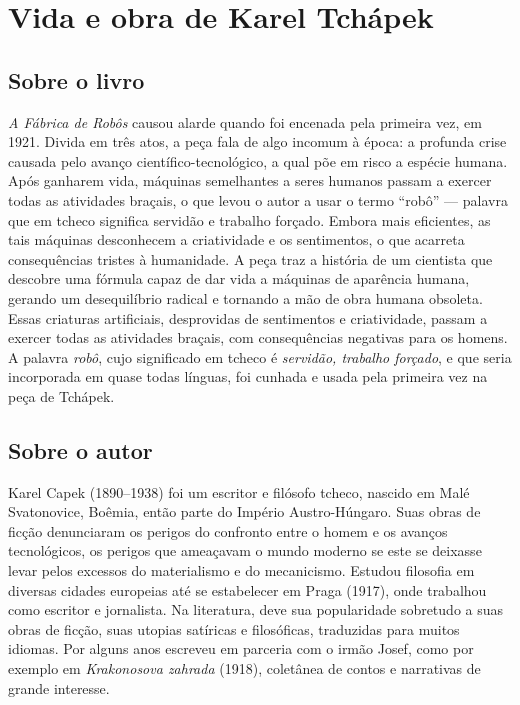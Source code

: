 \chapter{Vida e obra de Karel Tchápek}

\section{Sobre o livro}

\textit{A Fábrica de Robôs} causou alarde quando foi encenada
pela primeira vez, em 1921. Divida em três atos, a peça fala de 
algo incomum à época: a profunda crise causada pelo avanço
científico-tecnológico, a qual põe em risco a espécie humana. 
Após ganharem vida, máquinas semelhantes a seres humanos passam a exercer
todas as atividades braçais, o que levou o autor a usar o termo ``robô''
--- palavra que em tcheco significa servidão e trabalho forçado. Embora
mais eficientes, as tais máquinas
desconhecem a criatividade e os sentimentos, o que acarreta
consequências tristes à humanidade. A peça traz a história de um cientista que descobre uma
fórmula capaz de dar vida a máquinas de aparência humana, gerando um
desequilíbrio radical e tornando a mão de obra
humana obsoleta. Essas criaturas artificiais, desprovidas de sentimentos
e criatividade, passam a exercer todas as atividades braçais, com
consequências negativas para os homens. A palavra \textit{robô}, cujo
significado em tcheco é \textit{servidão, trabalho forçado}, e que seria
incorporada em quase todas línguas, foi cunhada e usada pela primeira
vez na peça de Tchápek.

\section{Sobre o autor}

Karel Capek (1890--1938) foi um escritor e filósofo tcheco,
nascido em Malé Svatonovice, Boêmia, então parte do Império
Austro-Húngaro. Suas obras de ficção denunciaram os perigos do confronto
entre o homem e os avanços tecnológicos, os perigos que ameaçavam o
mundo moderno se este se deixasse levar pelos excessos do materialismo e
do mecanicismo. Estudou filosofia em diversas cidades europeias até se
estabelecer em Praga (1917), onde trabalhou como escritor e jornalista.
Na literatura, deve sua
popularidade sobretudo a suas obras de ficção, suas utopias satíricas e
filosóficas, traduzidas para muitos idiomas. Por alguns anos escreveu em
parceria com o irmão Josef, como por exemplo em \textit{Krakonosova zahrada}
(1918), coletânea de contos e narrativas de grande interesse.

